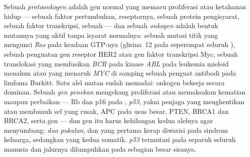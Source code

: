 \begin{definition}\label{def:b3:cancer-biology:genes}
%
Sebuah \emph{protoonkogen} adalah gen normal yang memacu proliferasi atau
ketahanan hidup --- sebuah faktor pertumbuhan, reseptornya, sebuah protein
pengisyarat, sebuah faktor transkripsi, sebuah  --- dan sebuah
\emph{onkogen} adalah bentuk mutannya yang aktif tanpa isyarat normalnya:
sebuah mutasi titik yang mengunci  \emph{Ras} pada keadaan GTP-nya
(glisina~12 pada seperempat seluruh ), sebuah penguatan gen reseptor
HER2 atau gen faktor transkripsi Myc, sebuah translokasi yang memfusikan
\emph{BCR} pada kinase \emph{ABL} pada leukemia mieloid menahun atau yang
menaruh \emph{MYC} di samping sebuah penguat antibodi pada limfoma Burkitt.
Satu alel mutan sudah memadai: onkogen bekerja secara dominan. Sebuah
\emph{gen penekan } mengekang proliferasi atau memaksakan kematian
maupun perbaikan --- Rb dan p16 pada , \emph{p53}, yakni penjaga
yang menghentikan atau membunuh sel yang rusak, APC pada  usus besar,
PTEN, BRCA1 dan BRCA2, serta gen  --- dan gen itu harus
kehilangan kedua alelnya agar menyumbang: \emph{dua pukulan}, dan yang pertama
kerap diwarisi pada sindrom  keluarga, sedangkan yang kedua somatik.
\emph{p53} termutasi pada separuh seluruh  manusia dan jalurnya
dilumpuhkan pada sebagian besar sisanya.
\end{definition}

